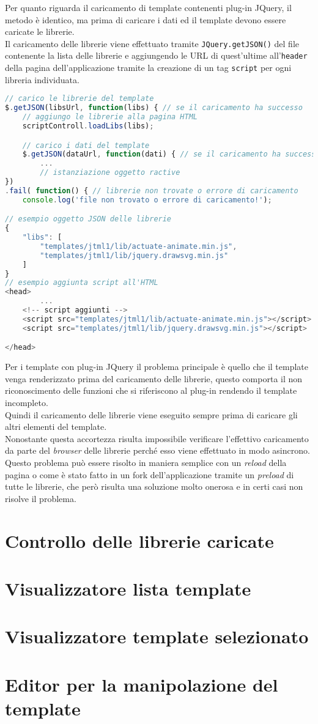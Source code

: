 Per quanto riguarda il caricamento di template contenenti plug-in JQuery, il metodo è identico, ma prima di caricare i dati ed il template devono essere caricate le librerie.\\
Il caricamento delle librerie viene effettuato tramite \texttt{JQuery.getJSON()} del file contenente la lista delle librerie e aggiungendo le URL di quest'ultime all'\texttt{header} della pagina dell'applicazione tramite la creazione di un tag \texttt{script} per ogni libreria individuata.\\
\begin{lstlisting}[language=JavaScript, caption=Esempio aggiunta librerie all'HTML dell'applicazione.]
// carico le librerie del template
$.getJSON(libsUrl, function(libs) { // se il caricamento ha successo
	// aggiungo le librerie alla pagina HTML
	scriptControll.loadLibs(libs);

	// carico i dati del template
	$.getJSON(dataUrl, function(dati) { // se il caricamento ha successo
		...
		// istanziazione oggetto ractive
})
.fail( function() { // librerie non trovate o errore di caricamento
	console.log('file non trovato o errore di caricamento!');

// esempio oggetto JSON delle librerie
{
	"libs": [
		"templates/jtml1/lib/actuate-animate.min.js",
		"templates/jtml1/lib/jquery.drawsvg.min.js"
	]
}
// esempio aggiunta script all'HTML
<head>
		...
	<!-- script aggiunti -->
	<script src="templates/jtml1/lib/actuate-animate.min.js"></script>
	<script src="templates/jtml1/lib/jquery.drawsvg.min.js"></script>

</head>

\end{lstlisting}
Per i template con plug-in JQuery il problema principale è quello che il template venga renderizzato prima del caricamento delle librerie, questo comporta il non riconoscimento delle funzioni che si riferiscono al plug-in rendendo il template incompleto.\\
Quindi il caricamento delle librerie viene eseguito sempre prima di caricare gli altri elementi del template.\\
Nonostante questa accortezza risulta impossibile verificare l'effettivo caricamento da parte del \textit{browser} delle librerie perché esso viene effettuato in modo asincrono.\\
Questo problema può essere risolto in maniera semplice con un \textit{reload} della pagina o come è stato fatto in un fork dell'applicazione tramite un \textit{preload} di tutte le librerie, che però risulta una soluzione molto onerosa e in certi casi non risolve il problema.

\section{Controllo delle librerie caricate}


\section{Visualizzatore lista template}

\section{Visualizzatore template selezionato}

\section{Editor per la manipolazione del template}
